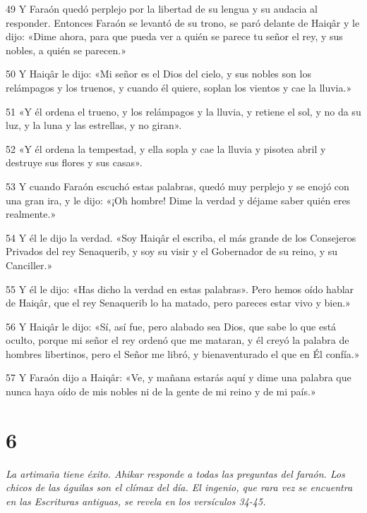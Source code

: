 \par 49 Y Faraón quedó perplejo por la libertad de su lengua y su audacia al responder. Entonces Faraón se levantó de su trono, se paró delante de Haiqâr y le dijo: «Dime ahora, para que pueda ver a quién se parece tu señor el rey, y sus nobles, a quién se parecen.»

\par 50 Y Haiqâr le dijo: «Mi señor es el Dios del cielo, y sus nobles son los relámpagos y los truenos, y cuando él quiere, soplan los vientos y cae la lluvia.»

\par 51 «Y él ordena el trueno, y los relámpagos y la lluvia, y retiene el sol, y no da su luz, y la luna y las estrellas, y no giran».

\par 52 «Y él ordena la tempestad, y ella sopla y cae la lluvia y pisotea abril y destruye sus flores y sus casas».

\par 53 Y cuando Faraón escuchó estas palabras, quedó muy perplejo y se enojó con una gran ira, y le dijo: «¡Oh hombre! Dime la verdad y déjame saber quién eres realmente.»

\par 54 Y él le dijo la verdad. «Soy Haiqâr el escriba, el más grande de los Consejeros Privados del rey Senaquerib, y soy su visir y el Gobernador de su reino, y su Canciller.»

\par 55 Y él le dijo: «Has dicho la verdad en estas palabras». Pero hemos oído hablar de Haiqâr, que el rey Senaquerib lo ha matado, pero pareces estar vivo y bien.»

\par 56 Y Haiqâr le dijo: «Sí, así fue, pero alabado sea Dios, que sabe lo que está oculto, porque mi señor el rey ordenó que me mataran, y él creyó la palabra de hombres libertinos, pero el Señor me libró, y bienaventurado el que en Él confía.»

\par 57 Y Faraón dijo a Haiqâr: «Ve, y mañana estarás aquí y dime una palabra que nunca haya oído de mis nobles ni de la gente de mi reino y de mi país.»

\chapter{6}

\par \textit{La artimaña tiene éxito. Ahikar responde a todas las preguntas del faraón. Los chicos de las águilas son el clímax del día. El ingenio, que rara vez se encuentra en las Escrituras antiguas, se revela en los versículos 34-45.}

